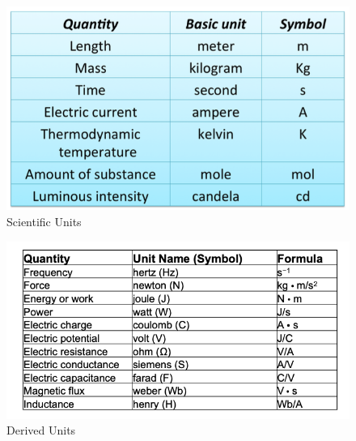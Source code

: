 \documentclass[14pt]{memoir}
\begin{document}
\begin{figure}[h]
\begin{center}
\includegraphics[scale=0.30]{fig/tab01_01.png}
\caption{Scientific Units}
\label{fig:t01_01}
\end{center}
\end{figure}

\begin{figure}[h]
\begin{center}
\includegraphics[scale=0.30]{fig/tab01_02.png}
\caption{Derived Units}
\label{fig:t01_02}
\end{center}
\end{figure}
\end{document}
